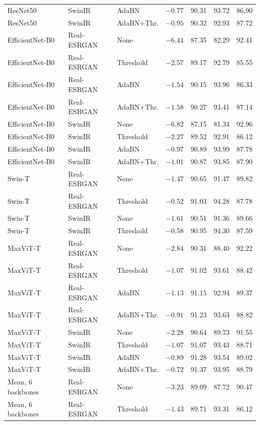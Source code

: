\documentclass[11pt]{article}
\begin{document}
{\begin{longtable}{@{}lllcccc@{}}
ResNet50 & SwinIR & AdaBN & $-0.77$ & 90.31 & 93.72 & 86.90 \\
ResNet50 & SwinIR & AdaBN+Thr. & $-0.95$ & 90.32 & 92.93 & 87.72 \\
\addlinespace
EfficientNet-B0 & Real-ESRGAN & None & $-6.44$ & 87.35 & 82.29 & 92.41 \\
EfficientNet-B0 & Real-ESRGAN & Threshold & $-2.57$ & 89.17 & 92.79 & 85.55 \\
EfficientNet-B0 & Real-ESRGAN & AdaBN & $-1.54$ & 90.15 & 93.96 & 86.33 \\
EfficientNet-B0 & Real-ESRGAN & AdaBN+Thr. & $-1.58$ & 90.27 & 93.41 & 87.14 \\
EfficientNet-B0 & SwinIR & None & $-6.82$ & 87.15 & 81.34 & 92.96 \\
EfficientNet-B0 & SwinIR & Threshold & $-2.27$ & 89.52 & 92.91 & 86.12 \\
EfficientNet-B0 & SwinIR & AdaBN & $-0.97$ & 90.89 & 93.99 & 87.78 \\
EfficientNet-B0 & SwinIR & AdaBN+Thr. & $-1.01$ & 90.87 & 93.85 & 87.90 \\
\addlinespace
Swin-T & Real-ESRGAN & None & $-1.47$ & 90.65 & 91.47 & 89.82 \\
Swin-T & Real-ESRGAN & Threshold & $-0.52$ & 91.03 & 94.28 & 87.78 \\
Swin-T & SwinIR & None & $-1.61$ & 90.51 & 91.36 & 89.66 \\
Swin-T & SwinIR & Threshold & $-0.58$ & 90.95 & 94.30 & 87.59 \\
\addlinespace
MaxViT-T & Real-ESRGAN & None & $-2.84$ & 90.31 & 88.40 & 92.22 \\
MaxViT-T & Real-ESRGAN & Threshold & $-1.07$ & 91.02 & 93.61 & 88.42 \\
MaxViT-T & Real-ESRGAN & AdaBN & $-1.13$ & 91.15 & 92.94 & 89.37 \\
MaxViT-T & Real-ESRGAN & AdaBN+Thr. & $-0.91$ & 91.23 & 93.63 & 88.82 \\
MaxViT-T & SwinIR & None & $-2.28$ & 90.64 & 89.73 & 91.55 \\
MaxViT-T & SwinIR & Threshold & $-1.07$ & 91.07 & 93.43 & 88.71 \\
MaxViT-T & SwinIR & AdaBN & $-0.89$ & 91.28 & 93.54 & 89.02 \\
MaxViT-T & SwinIR & AdaBN+Thr. & $-0.72$ & 91.37 & 93.95 & 88.79 \\
\midrule
Mean, 6 backbones & Real-ESRGAN & None & $-3.23$ & 89.09 & 87.72 & 90.47 \\
Mean, 6 backbones & Real-ESRGAN & Threshold & $-1.43$ & 89.71 & 93.31 & 86.12 \\

\end{longtable}}
\end{document}
